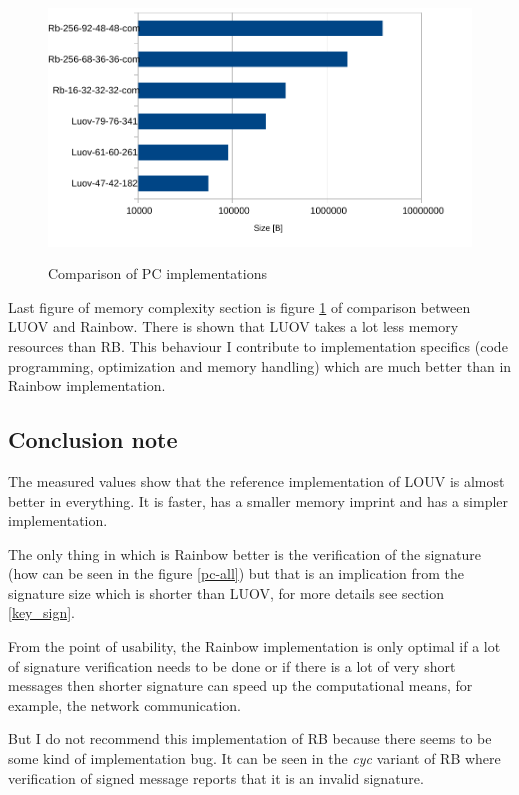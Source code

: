 \documentclass[thesis=M,english]{FITthesis}[2019/12/23]
\begin{document}
\begin{figure}[H]
\centering
\includegraphics[width=13cm,height=7cm]{images/mem-pc-all.pdf}
\caption{Comparison of PC implementations}
\label{mem-pc-all}
\end{figure}

\noindent
Last figure of memory complexity section is figure \ref{mem-pc-all} of comparison between LUOV and Rainbow. There is shown that LUOV takes a lot less memory resources than RB. This behaviour I contribute to implementation specifics (code programming, optimization and memory handling) which are much better than in Rainbow implementation.

\subsection{Conclusion note}
The measured values show that the reference implementation of LOUV is almost better in everything. It is faster, has a smaller memory imprint and has a simpler implementation.

\bigskip
\noindent
The only thing in which is Rainbow better is the verification of the signature (how can be seen in the figure \ref{pc-all}) but that is an implication from the signature size which is shorter than LUOV, for more details see section \ref{key_sign}.

\bigskip
\noindent
From the point of usability, the Rainbow implementation is only optimal if a lot of signature verification needs to be done or if there is a lot of very short messages then shorter signature can speed up the computational means, for example, the network communication.

\bigskip
\noindent
But I do not recommend this implementation of RB because there seems to be some kind of implementation bug. It can be seen in the \textit{cyc} variant of RB where verification of signed message reports that it is an invalid signature.
\end{document}
